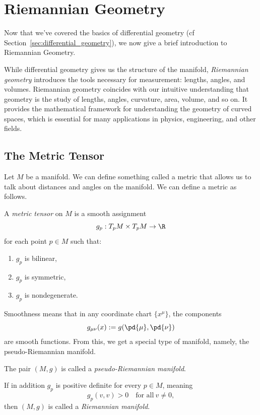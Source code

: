 \section{Riemannian Geometry}
\label{sec:riemannian_geometry}

Now that we've covered the basics of differential geometry (cf Section~\ref{sec:differential_geometry}), we now give a brief introduction to Riemannian Geometry.

While differential geometry gives us the structure of the manifold, \emph{Riemannian geometry} introduces the tools necessary for measurement: lengths, angles, and volumes. Riemannian geometry coincides with our intuitive understanding that geometry is the study of lengths, angles, curvature, area, volume, and so on. It provides the mathematical framework for understanding the geometry of curved spaces, which is essential for many applications in physics, engineering, and other fields.

\subsection{The Metric Tensor} Let $M$ be a manifold. We can define something called a metric that allows us to talk about distances and angles on the manifold. We can define a metric as follows.
\begin{definition}
  A \emph{metric tensor} on $M$ is a smooth assignment
  \[%
    g_p : T_pM \times T_pM \to \R
  \]%
  for each point $p \in M$ such that:
  \begin{enumerate}
    \item $g_p$ is bilinear,
    \item $g_p$ is symmetric,
    \item $g_p$ is nondegenerate.
  \end{enumerate}
\end{definition}

Smoothness means that in any coordinate chart $\{x^\mu\}$, the components
\[%
  g_{\mu\nu}(x) := g\!\left(\pd{\mu}, \pd{\nu}\right)
\]%
are smooth functions. From this, we get a special type of manifold, namely, the pseudo-Riemannian manifold.
\begin{definition}
  The pair $(M, g)$ is called a \emph{pseudo-Riemannian manifold}.

  If in addition $g_p$ is positive definite for every $p \in M$, meaning
  \[%
    g_p(v,v) > 0 \quad \text{for all}~v \neq 0
  ,\]%
  then $(M, g)$ is called a \emph{Riemannian manifold}.
\end{definition}

